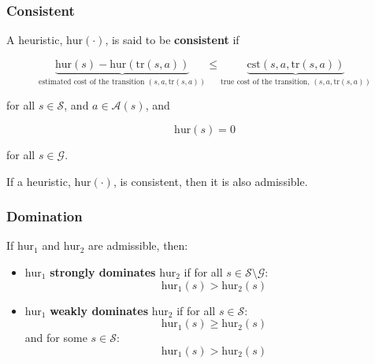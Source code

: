 \subsubsection{Consistent}
\begin{definition}
    A heuristic, $\text{hur}(\cdot)$, is said to be \textbf{consistent} if

    \begin{equation*}
        \underbrace{\text{hur}(s) - \text{hur}(\text{tr}(s,a))}_{\text{estimated cost of the transition }(s,a,\text{tr}(s,a))}
        \leq 
        \underbrace{\text{cst}(s,a,\text{tr}(s,a))}_{\text{true cost of the transition, }(s,a,\text{tr}(s,a))}
    \end{equation*}

    for all $s \in \mathcal{S}$, and $a \in \mathcal{A}(s)$, and

    \begin{equation*}
        \text{hur}(s) = 0
    \end{equation*}

    for all $s \in \mathcal{G}$.
\end{definition}

\begin{theorem}
    If a heuristic, $\text{hur}(\cdot)$, is consistent, then it is also admissible.
\end{theorem}

\subsubsection{Domination}
\begin{definition}
    If $\text{hur}_1$ and $\text{hur}_2$ are admissible, then:
    \begin{itemize}
        \item $\text{hur}_1$ \textbf{strongly dominates} $\text{hur}_2$ if for all $s \in \mathcal{S} \setminus \mathcal{G}$:
        \begin{equation*}
            \text{hur}_1(s) > \text{hur}_2(s)
        \end{equation*}

        \item $\text{hur}_1$ \textbf{weakly dominates} $\text{hur}_2$ if for all $s \in \mathcal{S}$:
        \begin{equation*}
            \text{hur}_1(s) \geq \text{hur}_2(s)
        \end{equation*}
        and for some $s \in \mathcal{S}$:
        \begin{equation*}
            \text{hur}_1(s) > \text{hur}_2(s)
        \end{equation*}
    \end{itemize}
\end{definition}

